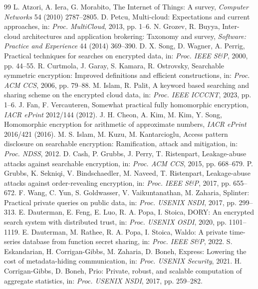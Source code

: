 \documentclass[11pt,a4paper]{article}
\begin{document}
\begin{thebibliography}{99}\small
{} L. Atzori, A. Iera, G. Morabito, The Internet of Things: A survey, \textit{Computer Networks} 54 (2010) 2787--2805.
 D. Petcu, Multi-cloud: Expectations and current approaches, in: \textit{Proc. MultiCloud}, 2013, pp. 1--6.
 N. Grozev, R. Buyya, Inter-cloud architectures and application brokering: Taxonomy and survey, \textit{Software: Practice and Experience} 44 (2014) 369--390.
 D. X. Song, D. Wagner, A. Perrig, Practical techniques for searches on encrypted data, in: \textit{Proc. IEEE S\&P}, 2000, pp. 44--55.
 R. Curtmola, J. Garay, S. Kamara, R. Ostrovsky, Searchable symmetric encryption: Improved definitions and efficient constructions, in: \textit{Proc. ACM CCS}, 2006, pp. 79--88.
 M. Islam, R. Palit, A keyword based searching and sharing scheme on the encrypted cloud data, in: \textit{Proc. IEEE ICCCNT}, 2023, pp. 1--6.
 J. Fan, F. Vercauteren, Somewhat practical fully homomorphic encryption, \textit{IACR ePrint} 2012/144 (2012).
 J. H. Cheon, A. Kim, M. Kim, Y. Song, Homomorphic encryption for arithmetic of approximate numbers, \textit{IACR ePrint} 2016/421 (2016).
 M. S. Islam, M. Kuzu, M. Kantarcioglu, Access pattern disclosure on searchable encryption: Ramification, attack and mitigation, in: \textit{Proc. NDSS}, 2012.
 D. Cash, P. Grubbs, J. Perry, T. Ristenpart, Leakage-abuse attacks against searchable encryption, in: \textit{Proc. ACM CCS}, 2015, pp. 668--679.
 P. Grubbs, K. Sekniqi, V. Bindschaedler, M. Naveed, T. Ristenpart, Leakage-abuse attacks against order-revealing encryption, in: \textit{Proc. IEEE S\&P}, 2017, pp. 655--672.
 F. Wang, C. Yun, S. Goldwasser, V. Vaikuntanathan, M. Zaharia, Splinter: Practical private queries on public data, in: \textit{Proc. USENIX NSDI}, 2017, pp. 299--313.
 E. Dauterman, E. Feng, E. Luo, R. A. Popa, I. Stoica, DORY: An encrypted search system with distributed trust, in: \textit{Proc. USENIX OSDI}, 2020, pp. 1101--1119.
 E. Dauterman, M. Rathee, R. A. Popa, I. Stoica, Waldo: A private time-series database from function secret sharing, in: \textit{Proc. IEEE S\&P}, 2022.
 S. Eskandarian, H. Corrigan-Gibbs, M. Zaharia, D. Boneh, Express: Lowering the cost of metadata-hiding communication, in: \textit{Proc. USENIX Security}, 2021.
 H. Corrigan-Gibbs, D. Boneh, Prio: Private, robust, and scalable computation of aggregate statistics, in: \textit{Proc. USENIX NSDI}, 2017, pp. 259--282.

\end{thebibliography}
\end{document}
